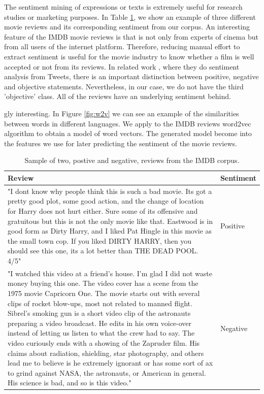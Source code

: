 \documentclass[conference]{IEEEtran}
\theoremstyle{plain}
\theoremstyle{definition}
\theoremstyle{remark}
\begin{document}
The sentiment mining of expressions or texts is extremely useful for research studies or marketing purposes. In Table \ref{tab:rev}, we show an example of three different movie reviews and its corresponding sentiment from our corpus. An interesting feature of the IMDB movie reviews is that is not only from experts of cinema but from all users of the internet platform. Therefore, reducing manual effort to extract sentiment is useful for the movie industry to know whether a film is well accepted or not from its reviews. In related work \cite{Pak}, where they do sentiment analysis from Tweets, there is an important distinction between positive, negative and objective statements. Nevertheless, in our case, we do not have the third 'objective' class. All of the reviews have an underlying sentiment behind. 

gly interesting. In Figure \ref{fig:w2v} we can see an example of the similarities between words in different languages. We apply to the IMDB  reviews word2vec algorithm to obtain a model of word vectors. The generated model become into the features we use for later predicting the sentiment of the movie reviews. 

\begin{table}[tbh]
\begin{center}
	\begin{tabular}{ | m{40em} | m{1.5cm}|  } 
		\hline
		\textbf{Review} & \textbf{Sentiment} \\ 
		\hline
		"I dont know why people think this is such a bad movie. Its got a pretty good plot, some good action, and the change of location for Harry does not hurt either. Sure some of its offensive and gratuitous but this is not the only movie like that. Eastwood is in good form as Dirty Harry, and I liked Pat Hingle in this movie as the small town cop. If you liked DIRTY HARRY, then you should see this one, its a lot better than THE DEAD POOL. 4/5" & Positive  \\ 
		\hline
		"I watched this video at a friend's house. I'm glad I did not waste money buying this one. The video cover has a scene from the 1975 movie Capricorn One. The movie starts out with several clips of rocket blow-ups, most not related to manned flight. Sibrel's smoking gun is a short video clip of the astronauts preparing a video broadcast. He edits in his own voice-over instead of letting us listen to what the crew had to say. The video curiously ends with a showing of the Zapruder film. His claims about radiation, shielding, star photography, and others lead me to believe is he extremely ignorant or has some sort of ax to grind against NASA, the astronauts, or American in general. His science is bad, and so is this video." & Negative  \\ 
		\hline
	\end{tabular}
	\caption{Sample of two, postive and negative, reviews from the IMDB corpus.}
	\label{tab:rev}
\end{center}
\end{table}
\end{document}
